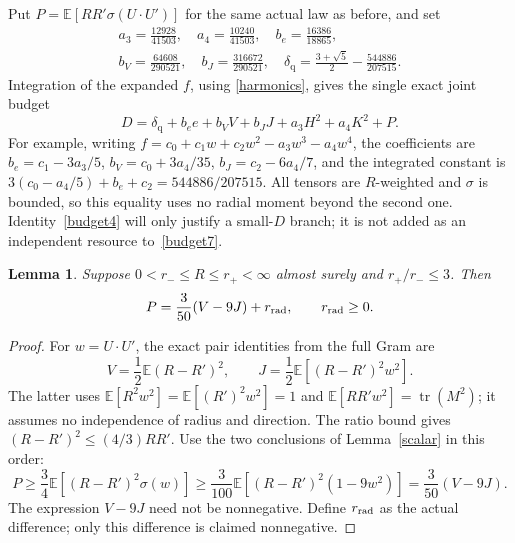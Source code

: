 \documentclass[11pt]{article}
\newtheorem{lemma}[theorem]{Lemma}
\theoremstyle{remark}\newtheorem{remark}[theorem]{Remark}
\newcommand{\E}{\mathbb E}
\DeclareMathOperator{\tr}{tr}
\numberwithin{equation}{section}
\begin{document}
Put $P=\E[RR'\sigma(U\cdot U')]$ for the same actual law as before, and set
\[
 \begin{gathered}
 a_3=\frac{12928}{41503},\quad a_4=\frac{10240}{41503},\quad
 b_e=\frac{16386}{18865},\\
 b_V=\frac{64608}{290521},\quad b_J=\frac{316672}{290521},\quad
 \delta_{\mathrm q}=\frac{3+\sqrt5}{2}-\frac{544886}{207515}.
 \end{gathered}
\]
Integration of the expanded $f$, using \eqref{harmonics}, gives the single
exact joint budget
\begin{equation}\label{budget7}
 D=\delta_{\mathrm q}+b_e e+b_V V+b_J J+a_3H^2+a_4K^2+P.
\end{equation}
For example, writing $f=c_0+c_1w+c_2w^2-a_3w^3-a_4w^4$,
the coefficients are $b_e=c_1-3a_3/5$, $b_V=c_0+3a_4/35$,
$b_J=c_2-6a_4/7$, and the integrated constant is
$3(c_0-a_4/5)+b_e+c_2=544886/207515$.
All tensors are $R$-weighted and $\sigma$ is bounded, so this equality
uses no radial moment beyond the second one. Identity~\eqref{budget4} will only justify a small-$D$ branch; it is
not added as an independent resource to~\eqref{budget7}.

\begin{lemma}\label{radialpayment}
Suppose $0<r_-\le R\le r_+<\infty$ almost surely and $r_+/r_-\le3$.
Then
\begin{equation}\label{payment}
 P=\frac3{50}(V-9J)+r_{\rm rad},\qquad r_{\rm rad}\ge0.
\end{equation}
\end{lemma}
\begin{proof}
For $w=U\cdot U'$, the exact pair identities from the full Gram are
\[
 V=\frac12\E(R-R')^2,\qquad
 J=\frac12\E[(R-R')^2w^2].
\]
The latter uses $\E[R^2w^2]=\E[(R')^2w^2]=1$ and
$\E[RR'w^2]=\tr(M^2)$; it assumes no independence of radius and direction.
The ratio bound gives $(R-R')^2\le(4/3)RR'$. Use the two conclusions
of Lemma~\ref{scalar} in this order:
\[
 P\ge\frac34\E[(R-R')^2\sigma(w)]
   \ge\frac3{100}\E[(R-R')^2(1-9w^2)]
    =\frac3{50}(V-9J).
\]
The expression $V-9J$ need not be nonnegative. Define $r_{\rm rad}$
as the actual difference; only this difference is claimed nonnegative.
\end{proof}
\end{document}
